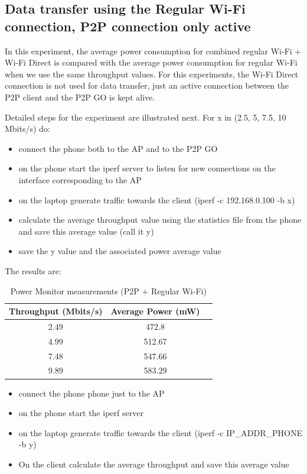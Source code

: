 
\subsection{Data transfer using the Regular Wi-Fi connection, P2P connection only active}
\label{sub-sec:transfer-parallel}

In this experiment, the average power consumption for combined regular Wi-Fi + Wi-Fi Direct is compared with the average power consumption for regular Wi-Fi when we use the same throughput values. For this experiments, the Wi-Fi Direct connection is not used for data transfer, just an active connection between the P2P client and the P2P GO is kept alive. 

Detailed steps for the experiment are illustrated next. For x in (2.5, 5, 7.5, 10 Mbits/s) do:
\begin{itemize}
  \item connect the phone both to the AP and to the P2P GO
  \item on the phone start the iperf server to listen for new connections on the interface corresponding to the AP
  \item on the laptop generate traffic towards the client (iperf -c 192.168.0.100 -b x)
  \item calculate the average throughput value using the statistics file from the phone and save this average value (call it y)
  \item save the y value and the associated power average value
\end{itemize}

The results are:

\begin{table}[h!]
  \centering
  \caption{Power Monitor measurements (P2P + Regular Wi-Fi)}
  \label{tab:table1}
  \begin{tabular}{ccc}
    \toprule
    Throughput (Mbits/s) & Average Power (mW) \\
    \midrule
    2.49 & 472.8\\
    4.99 & 512.67\\
    7.48 & 547.66\\
    9.89 & 583.29\\
    \bottomrule
  \end{tabular}
\end{table}

\begin{itemize}
  \item connect the phone phone just to the AP
  \item on the phone start the iperf server
  \item on the laptop generate traffic towards the client (iperf -c IP_ADDR_PHONE -b y)
  \item On the client calculate the average throughput and save this average value
\end{itemize}

